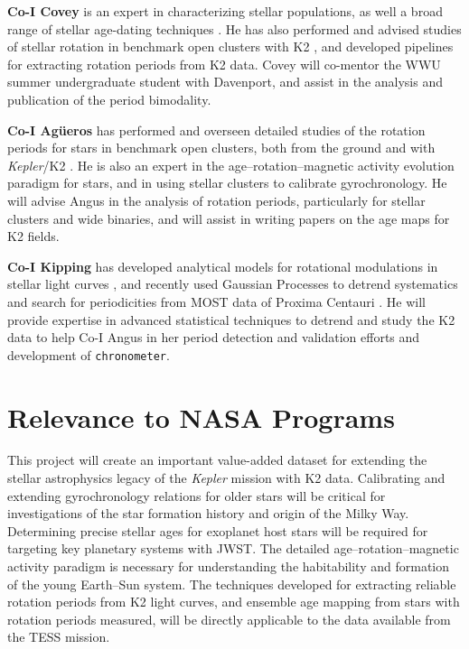 \documentclass[12pt]{article}
\newcommand{\Kepler}{\textsl{Kepler}\xspace}
\begin{document}
{\bf Co-I Covey} is an expert in characterizing stellar populations, as well a broad range of stellar age-dating techniques \citep{covey2010white}. He has also performed and advised studies of stellar rotation in benchmark open clusters with K2 \citep{douglas2016,covey2016}, and developed pipelines for extracting rotation periods from K2 data. Covey will co-mentor the WWU summer undergraduate student with Davenport, and assist in the analysis and publication of the period bimodality.

{\bf Co-I Ag\"{u}eros} has performed and overseen detailed studies of the rotation periods for stars in benchmark open clusters, both from the ground \citep{agueros2011} and with \Kepler/K2 \citep{douglas2016,douglas2017,nunez2017}. He is also an expert in the age--rotation--magnetic activity evolution paradigm for stars, and in using stellar clusters to calibrate gyrochronology. He will advise Angus in the analysis of rotation periods, particularly for stellar clusters and wide binaries, and will assist in writing papers on the age maps for K2 fields.

{\bf Co-I Kipping}
has developed analytical models for rotational modulations in stellar light curves \citep{kipping2012}, and recently used Gaussian Processes to detrend systematics and search for periodicities from MOST data of Proxima Centauri \citep{kippingmost}. He will provide expertise in advanced statistical techniques to detrend and study the K2 data to help Co-I Angus in her period detection and validation efforts and development of {\tt chronometer}.




\section{Relevance to NASA Programs}
This project will create an important value-added dataset for extending the stellar astrophysics legacy of the \Kepler mission with K2 data. 
Calibrating and extending gyrochronology relations for older stars will be critical for  investigations of the star formation history and origin of the Milky Way. Determining precise stellar ages for exoplanet host stars will be required for targeting key planetary systems with JWST. The detailed age--rotation--magnetic activity paradigm is necessary for understanding the habitability and formation of the young Earth--Sun system. The techniques developed for extracting reliable rotation periods from K2 light curves, and ensemble age mapping from stars with rotation periods measured, will be directly applicable to the data available from the TESS mission.
\end{document}
